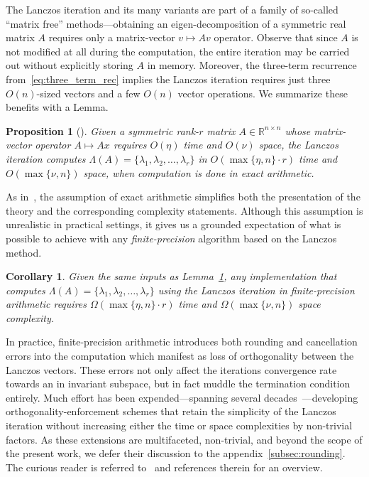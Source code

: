 \documentclass[12pt]{article}
\numberwithin{equation}{section}
\newcommand{\+}{%
	\raisebox{0.18ex}{\scaleobj{0.55}{+}}
}
\newtheorem{proposition}{Proposition}
\newtheorem{corollary}{Corollary}
\theoremstyle{definition}
\begin{document}
 The Lanczos iteration and its many variants are part of a family of so-called ``matrix free'' methods---obtaining an eigen-decomposition of a symmetric real matrix $A$ requires only a matrix-vector $v \mapsto Av$ operator. 
Observe that since $A$ is not modified at all during the computation, the entire iteration may be carried out without explicitly storing $A$ in memory. 
Moreover, the three-term recurrence from~\eqref{eq:three_term_rec} implies the Lanczos iteration requires just three $O(n)$-sized vectors and a few $O(n)$ vector operations. We summarize these benefits with a Lemma. 
\begin{proposition}[\cite{parlett1994we, simon1984analysis}]\label{lemma:exact_arith_lanczos}
	Given a symmetric rank-$r$ matrix $A \in \mathbb{R}^{n \times n}$ whose matrix-vector operator $A \mapsto A x$ requires $O(\eta)$ time and $O(\nu)$ space, the Lanczos iteration computes $\Lambda(A) = \{ \lambda_1, \lambda_2, \dots, \lambda_r \}$ in $O(\max\{\eta, n\}\cdot r)$ time and $O(\max\{\nu, n\})$ space, when computation is done in exact arithmetic. 
\end{proposition}
\noindent As in~\cite{parlett1994we}, the assumption of exact arithmetic simplifies both the presentation of the theory and the corresponding complexity statements. 
Although this assumption is unrealistic in practical settings, it gives us a grounded expectation of what is possible to achieve with any \emph{finite-precision} algorithm based on the Lanczos method.
\begin{corollary}\label{cor:finite_arith_lanczos}
	Given the same inputs as Lemma~\ref{lemma:exact_arith_lanczos}, any implementation that computes $\Lambda(A) = \{ \lambda_1, \lambda_2, \dots, \lambda_r \}$ using the Lanczos iteration in finite-precision arithmetic requires $\Omega(\max\{\eta, n\} \cdot r)$ time and $\Omega(\max\{\nu, n\})$ space complexity. 
\end{corollary}
\noindent
In practice, finite-precision arithmetic introduces both rounding and cancellation errors into the computation which manifest as loss of orthogonality between the Lanczos vectors. These errors not only affect the iterations convergence rate towards an in invariant subspace, but in fact muddle the termination condition entirely. 
Much effort has been expended---spanning several decades~\cite{}---developing orthogonality-enforcement schemes that retain the simplicity of the Lanczos iteration without increasing either the time or space complexities by non-trivial factors. 
As these extensions are multifaceted, non-trivial, and beyond the scope of the present work, we defer their discussion to the appendix~\ref{subsec:rounding}. The curious reader is referred to~\cite{} and references therein for an overview. 
\end{document}
